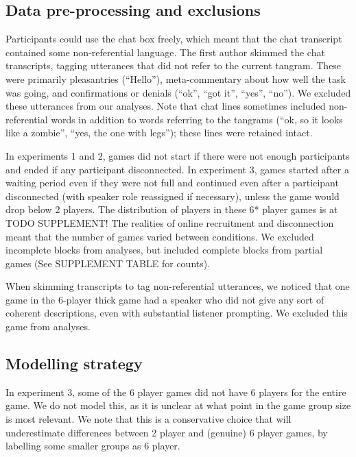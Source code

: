 \documentclass[
  english,
  a4paper,
]{article}
\begin{document}
\hypertarget{data-pre-processing-and-exclusions}{%
\subsection{Data pre-processing and exclusions}\label{data-pre-processing-and-exclusions}}

Participants could use the chat box freely, which meant that the chat transcript contained some non-referential language. The first author skimmed the chat transcripts, tagging utterances that did not refer to the current tangram. These were primarily pleasantries (``Hello''), meta-commentary about how well the task was going, and confirmations or denials (``ok'', ``got it'', ``yes'', ``no''). We excluded these utterances from our analyses. Note that chat lines sometimes included non-referential words in addition to words referring to the tangrams (``ok, so it looks like a zombie'', ``yes, the one with legs''); these lines were retained intact.

In experiments 1 and 2, games did not start if there were not enough participants and ended if any participant disconnected. In experiment 3, games started after a waiting period even if they were not full and continued even after a participant disconnected (with speaker role reassigned if necessary), unless the game would drop below 2 players. The distribution of players in these 6* player games is at TODO SUPPLEMENT! The realities of online recruitment and disconnection meant that the number of games varied between conditions. We excluded incomplete blocks from analyses, but included complete blocks from partial games (See SUPPLEMENT TABLE for counts).

When skimming transcripts to tag non-referential utterances, we noticed that one game in the 6-player thick game had a speaker who did not give any sort of coherent descriptions, even with substantial listener prompting. We excluded this game from analyses.

\hypertarget{modelling-strategy}{%
\subsection{Modelling strategy}\label{modelling-strategy}}

In experiment 3, some of the 6 player games did not have 6 players for the entire game. We do not model this, as it is unclear at what point in the game group size is most relevant. We note that this is a conservative choice that will underestimate differences between 2 player and (genuine) 6 player games, by labelling some smaller groups as 6 player.
\end{document}
